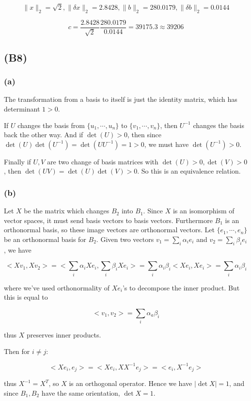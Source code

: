 \documentclass{article}
\begin{document}
\[ \|x\|_2 = \sqrt{2}, \|\delta x \|_2 = 2.8428, \|b\|_2 = 280.0179, \|\delta b\|_2 = 0.0144 \]

\[ c = \dfrac{2.8428}{\sqrt{2}} \dfrac{280.0179}{0.0144} = 39175.3 \approx 39206\]

\subsection{(B8)}

\subsubsection{(a)} The transformation from a basis to itself is just the identity matrix, which has determinant $1 > 0$.

If $U$ changes the basis from $\{u_1,\cdots,u_n\}$ to $\{v_1,\cdots,v_n\}$, then $U^{-1}$ changes the basis back the other way. And if $\det(U) > 0$, then since $\det(U) \det(U^{-1}) = \det(UU^{-1}) = 1 > 0$, we must have $\det(U^{-1}) > 0$. 

Finally if $U,V$ are two change of basis matrices with $\det(U)>0, \det(V)>0$, then $\det(UV)=\det(U)\det(V) > 0 $. So this is an equivalence relation. 

\subsubsection{(b)} Let $X$ be the matrix which changes $B_2$ into $B_1$. Since $X$ is an isomorphism of vector spaces, it must send basis vectors to basis vectors. Furthermore $B_1$ is an orthonormal basis, so these image vectors are orthonormal vectors. Let $\{e_1,\cdots,e_n\}$ be an orthonormal basis for $B_2$. Given two vectors $v_1 = \displaystyle\sum_i \alpha_i e_i$ and $v_2 = \displaystyle\sum_i \beta_i e_i$, we have

\[ <Xv_1, Xv_2> = <\sum_i \alpha_i X e_i, \sum_i \beta_i X e_i> = \sum_i \alpha_i \beta_i < Xe_i, X e_i> = \sum_i \alpha_i \beta_i\]

where we've used orthonormality of $Xe_i$'s to decompose the inner product. But this is equal to 

\[ <v_1, v_2> = \sum_i \alpha_a \beta_i \]

thus $X$ preserves inner products. 

Then for $i\neq j$:

\[ <X e_i, e_j> = <Xe_i, XX^{-1} e_j > = <e_i, X^{-1} e_j> \]

thus $X^{-1} = X^T$, so $X$ is an orthogonal operator. Hence we have $|\det X| = 1$, and since $B_1,B_2$ have the same orientation, $\det X = 1$. 
\end{document}
